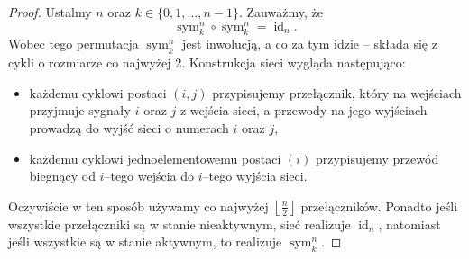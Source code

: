 \documentclass[a4paper]{article}
\newcommand{\sym}[2]{\operatorname{sym}_{#2}^{#1}}
\newcommand{\id}[1]{\operatorname{id}_{#1}}
\newcommand{\td}{\text{.}}
\newcommand{\floor}[1]{\left\lfloor #1 \right\rfloor}
\theoremstyle{definition}
\begin{document}
\begin{proof}
    Ustalmy \(n\) oraz \(k \in \{0, 1, \ldots, n-1\}\). Zauważmy, że 
    \[
    \sym{n}{k} \circ \sym{n}{k} = \id{n} \td
    \]
    Wobec tego permutacja \(\sym n k\) jest inwolucją, a co za tym idzie -- składa się z cykli o rozmiarze co najwyżej 2. Konstrukcja sieci wygląda następująco:
    \begin{itemize}
        \item każdemu cyklowi postaci \((i,j)\) przypisujemy przełącznik, który na wejściach przyjmuje sygnały \(i\) oraz \(j\) z wejścia sieci, a przewody na jego wyjściach prowadzą do wyjść sieci o numerach \(i\) oraz \(j\),
        \item każdemu cyklowi jednoelementowemu postaci \((i)\) przypisujemy przewód biegnący od \(i\)--tego wejścia do \(i\)--tego wyjścia sieci.
    \end{itemize}
    Oczywiście w ten sposób używamy co najwyżej \(\floor{\frac{n}{2}}\) przełączników. 
    Ponadto jeśli wszystkie przełączniki są w stanie nieaktywnym, sieć realizuje \(\id n\), natomiast jeśli wszystkie są w stanie aktywnym, to realizuje \(\sym n k\).
\end{proof}
\end{document}
